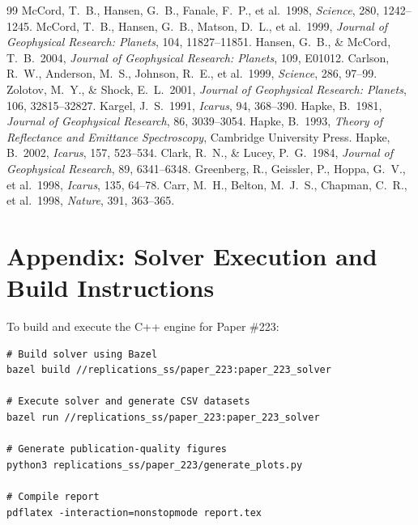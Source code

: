 \documentclass[11pt,a4paper]{article}
\begin{document}
\begin{thebibliography}{99}
 McCord, T.~B., Hansen, G.~B., Fanale, F.~P., et al.\ 1998, \textit{Science}, 280, 1242--1245.
 McCord, T.~B., Hansen, G.~B., Matson, D.~L., et al.\ 1999, \textit{Journal of Geophysical Research: Planets}, 104, 11827--11851.
 Hansen, G.~B., \& McCord, T.~B.\ 2004, \textit{Journal of Geophysical Research: Planets}, 109, E01012.
 Carlson, R.~W., Anderson, M.~S., Johnson, R.~E., et al.\ 1999, \textit{Science}, 286, 97--99.
 Zolotov, M.~Y., \& Shock, E.~L.\ 2001, \textit{Journal of Geophysical Research: Planets}, 106, 32815--32827.
 Kargel, J.~S.\ 1991, \textit{Icarus}, 94, 368--390.
 Hapke, B.\ 1981, \textit{Journal of Geophysical Research}, 86, 3039--3054.
 Hapke, B.\ 1993, \textit{Theory of Reflectance and Emittance Spectroscopy}, Cambridge University Press.
 Hapke, B.\ 2002, \textit{Icarus}, 157, 523--534.
 Clark, R.~N., \& Lucey, P.~G.\ 1984, \textit{Journal of Geophysical Research}, 89, 6341--6348.
 Greenberg, R., Geissler, P., Hoppa, G.~V., et al.\ 1998, \textit{Icarus}, 135, 64--78.
 Carr, M.~H., Belton, M.~J.~S., Chapman, C.~R., et al.\ 1998, \textit{Nature}, 391, 363--365.
\end{thebibliography}

\section*{Appendix: Solver Execution and Build Instructions}
To build and execute the C++ engine for Paper \#223:
\begin{verbatim}
# Build solver using Bazel
bazel build //replications_ss/paper_223:paper_223_solver

# Execute solver and generate CSV datasets
bazel run //replications_ss/paper_223:paper_223_solver

# Generate publication-quality figures
python3 replications_ss/paper_223/generate_plots.py

# Compile report
pdflatex -interaction=nonstopmode report.tex
\end{verbatim}
\end{document}
